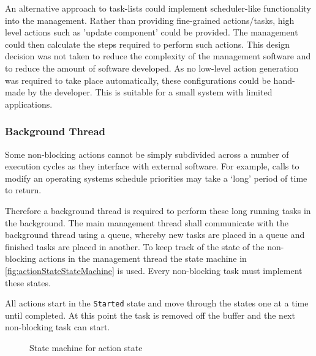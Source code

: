


An alternative approach to task-lists could implement scheduler-like functionality into the management. Rather than providing fine-grained actions/tasks, high level actions such as 'update component' could be provided. The management could then calculate the steps required to perform such actions. This design decision was not taken to reduce the complexity of the management software and to reduce the amount of software developed. As no low-level action generation was required to take place automatically, these configurations could be hand-made by the developer. This is suitable for a small system with limited applications.

\clearpage

\subsubsection{Background Thread}
Some non-blocking actions cannot be simply subdivided across a number of execution cycles as they interface with external software. For example, calls to modify an operating systems schedule priorities may take a `long' period of time to return.

Therefore a background thread is required to perform these long running tasks in the background. The main management thread shall communicate with the background thread using a queue, whereby new tasks are placed in a queue and finished tasks are placed in another. To keep track of the state of the non-blocking actions in the management thread the state machine in \autoref{fig:actionStateStateMachine} is used. Every non-blocking task must implement these states.

All actions start in the \verb|Started| state and move through the states one at a time until completed. At this point the task is removed off the buffer and the next non-blocking task can start.

\begin{figure}[ht]
    \centering
    \caption[State machine for action state]
    {State machine for action state}
    \label{fig:actionStateStateMachine}
\end{figure}

